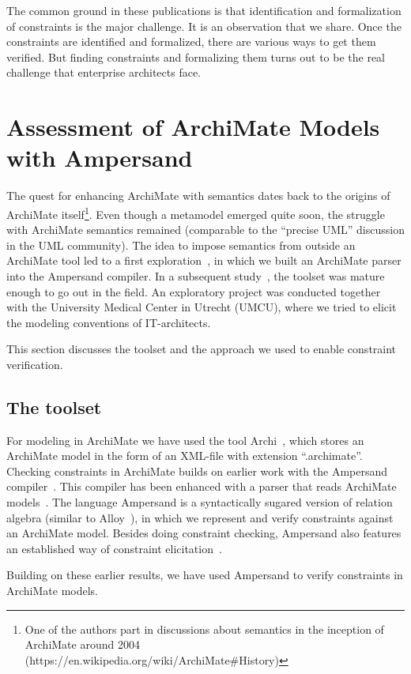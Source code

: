 \documentclass[sn-vancouver]{sn-jnl}%
\theoremstyle{thmstyleone}%
\theoremstyle{thmstyletwo}%
\theoremstyle{thmstylethree}%
\begin{document}
The common ground in these publications is that identification and formalization of constraints is the major challenge.
It is an observation that we share.
Once the constraints are identified and formalized, there are various ways to get them verified.
But finding constraints and formalizing them turns out to be the real challenge that enterprise architects face.

\section{Assessment of ArchiMate Models with Ampersand}\label{toolset}
The quest for enhancing ArchiMate with semantics dates back to the origins of ArchiMate itself\footnote{One of the authors part in discussions about semantics in the inception of ArchiMate around 2004 (https://en.wikipedia.org/wiki/ArchiMate\#History)}.
Even though a metamodel emerged quite soon, the struggle with ArchiMate semantics remained (comparable to the ``precise UML'' discussion in the UML community).
The idea to impose semantics from outside an ArchiMate tool led to a first exploration~\cite{filetenterprise},
in which we built an ArchiMate parser into the Ampersand compiler.
In a subsequent study~\cite{iceis22}, the toolset was mature enough to go out in the field.
An exploratory project was conducted together with the University Medical Center in Utrecht (UMCU),
where we tried to elicit the modeling conventions of IT-architects.

This section discusses the toolset and the approach we used to enable constraint verification.

\subsection{The toolset}
For modeling in ArchiMate we have used the tool Archi~\cite{beauvoir2018archi},
which stores an ArchiMate model in the form of an XML-file with extension ``.archimate''.
Checking constraints in ArchiMate builds on earlier work with the Ampersand compiler~\cite{joosten2018relation}.
This compiler has been enhanced with a parser that reads ArchiMate models~\cite{filetenterprise}.
The language Ampersand is a syntactically sugared version of relation algebra (similar to Alloy~\cite{Alloy2006}),
in which we represent and verify constraints against an ArchiMate model.
Besides doing constraint checking, Ampersand also features an established way of constraint elicitation~\cite{wedemeijer2014relation}.

Building on these earlier results,
we have used Ampersand to verify constraints in ArchiMate models.
\end{document}
